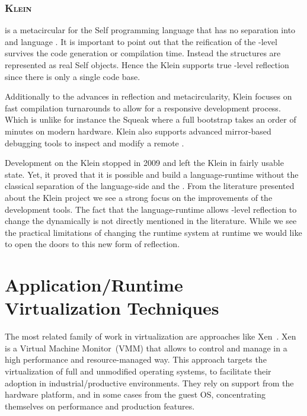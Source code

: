 \subsubsection*{\textsc{Klein \VM}}

 is a metacircular \VM for the Self programming language that has no separation into \VM and language \cite{Unga05a}.
It is important to point out that the reification of the \VM-level survives the code generation or compilation time.
Instead the \VM structures are represented as real Self objects.
Hence the Klein \VM supports true \VM-level reflection since there is only a single code base.

Additionally to the advances in reflection and metacircularity, Klein focuses on fast compilation turnarounds to allow for a responsive development process.
Which is unlike for instance the Squeak \VM where a full \VM bootstrap takes an order of minutes on modern hardware.
Klein also supports advanced mirror-based debugging tools to inspect and modify a remote \VM.

Development on the Klein \VM stopped in 2009 and left the Klein \VM in fairly usable state.
Yet, it proved that it is possible and build a language-runtime without the classical separation of the language-side and the \VM.
From the literature presented about the Klein project we see a strong focus on the improvements of the development tools.
The fact that the language-runtime allows \VM-level reflection to change the \VM dynamically is not directly mentioned in the literature.
While we see the practical limitations of changing the \VM runtime system at runtime we would like to open the doors to this new form of reflection.

\newpage
\section{Application/Runtime Virtualization Techniques}

The most related family of work in virtualization are approaches like Xen~\cite{Chis07xen}. Xen is a Virtual Machine Monitor~(VMM) that allows to control and manage \VM in a high performance and resource-managed way. This approach targets the virtualization of full and unmodified operating systems, to facilitate their adoption in industrial/productive environments. They rely on support from the hardware platform, and in some cases from the guest OS, concentrating themselves on performance and production features.

